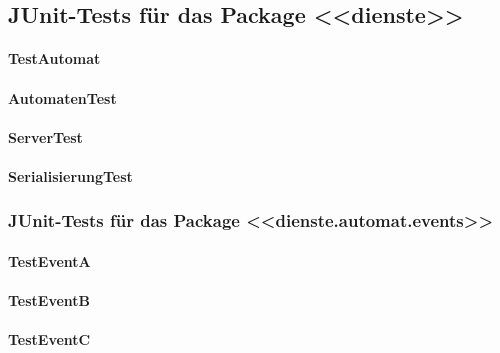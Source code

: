 \documentclass[12pt,halfparskip]{scrartcl}
\begin{document}
\subsection{JUnit-Tests für das Package <<dienste>>}\label{sub:junit_tests_für_das_package_dienste_} %
	\paragraph{TestAutomat}\label{ssub:testautomat} %
	
	\paragraph{AutomatenTest}\label{ssub:automatentest} %
	
	\paragraph{ServerTest}\label{ssub:servertest} %
	
	\paragraph{SerialisierungTest}\label{ssub:serialisierungtest} %
	
	\subsubsection{JUnit-Tests für das Package <<dienste.automat.events>>}\label{ssub:junit_tests_für_das_package_dienste_automat_events_} %
		\paragraph{TestEventA}\label{ssub:testeventa} %
		
		\paragraph{TestEventB}\label{ssub:testeventb} %
		
		\paragraph{TestEventC}\label{ssub:testeventc} %
		
\end{document}
